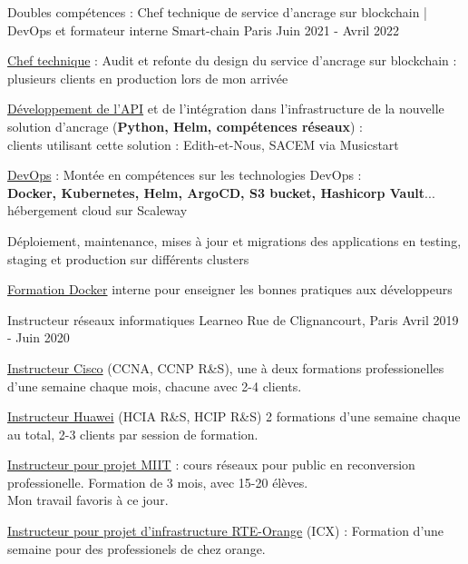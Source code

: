 
\begin{cventries}
  \cventry
    {Doubles compétences : Chef technique de service d'ancrage sur blockchain | DevOps et formateur interne} %
    {Smart-chain} %
    {Paris} %
    {Juin 2021 - Avril 2022} %
    {
      \begin{cvitems} %
      {
        \item {\underline{Chef technique} : Audit et refonte du design du service d'ancrage sur blockchain :\\plusieurs clients en production lors de mon arrivée}
        \item {\underline{Développement de l'API} et de l'intégration dans l'infrastructure de la nouvelle solution d'ancrage (\textbf{Python, Helm, compétences réseaux}) :\\clients utilisant cette solution : Edith-et-Nous, SACEM via Musicstart}
        \item {\underline{DevOps} : Montée en compétences sur les technologies DevOps :\\\textbf{Docker, Kubernetes, Helm, ArgoCD, S3 bucket, Hashicorp Vault}... hébergement cloud sur Scaleway}
        \item {Déploiement, maintenance, mises à jour et migrations des applications en testing, staging et production sur différents clusters}
        \item {\underline{Formation Docker} interne pour enseigner les bonnes pratiques aux développeurs}
      }
      \end{cvitems}
    }

  \cventry
    {Instructeur réseaux informatiques} %
    {Learneo} %
    {Rue de Clignancourt, Paris} %
    {Avril 2019 - Juin 2020} %
    {
      \begin{cvitems} %
      {
        \item {\underline{Instructeur Cisco} (CCNA, CCNP R\&S), une à deux formations professionelles d'une semaine chaque mois, chacune avec 2-4 clients.}
        \item {\underline{Instructeur Huawei} (HCIA R\&S, HCIP R\&S) 2 formations d'une semaine chaque au total, 2-3 clients par session de formation.}
        \item {\underline{Instructeur pour projet MIIT} : cours réseaux pour public en reconversion professionelle. Formation de 3 mois, avec 15-20 élèves.\\Mon travail favoris à ce jour.}
        \item {\underline{Instructeur pour projet d'infrastructure RTE-Orange} (ICX) : Formation d'une semaine pour des professionels de chez orange.}
      }
      \end{cvitems}
    }


\end{cventries}
